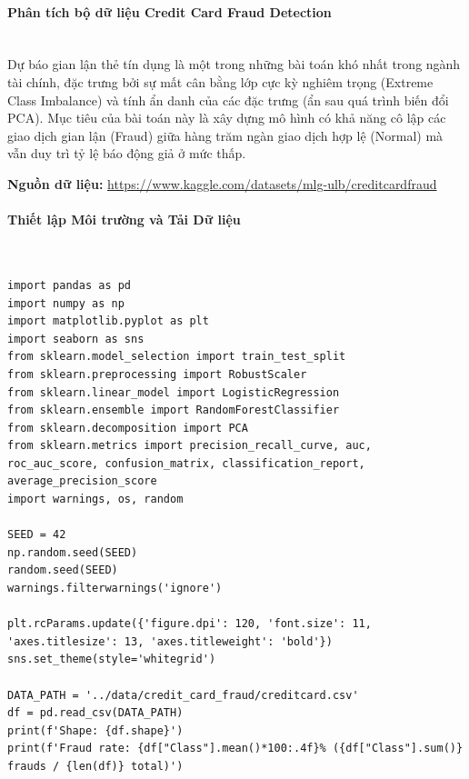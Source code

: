 \paragraph{Phân tích bộ dữ liệu Credit Card Fraud Detection} \hfill \\

Dự báo gian lận thẻ tín dụng là một trong những bài toán khó nhất trong ngành tài chính, đặc trưng bởi sự mất cân bằng lớp cực kỳ nghiêm trọng (Extreme Class Imbalance) và tính ẩn danh của các đặc trưng (ẩn sau quá trình biến đổi PCA). Mục tiêu của bài toán này là xây dựng mô hình có khả năng cô lập các giao dịch gian lận (Fraud) giữa hàng trăm ngàn giao dịch hợp lệ (Normal) mà vẫn duy trì tỷ lệ báo động giả ở mức thấp.

\begin{center}
    \textbf{Nguồn dữ liệu:} \url{https://www.kaggle.com/datasets/mlg-ulb/creditcardfraud}
\end{center}

\paragraph{Thiết lập Môi trường và Tải Dữ liệu} \hfill \\

\begin{lstlisting}[style=pythoncode, caption={Load libraries and initialize random seed for reproducibility}]
import pandas as pd
import numpy as np
import matplotlib.pyplot as plt
import seaborn as sns
from sklearn.model_selection import train_test_split
from sklearn.preprocessing import RobustScaler
from sklearn.linear_model import LogisticRegression
from sklearn.ensemble import RandomForestClassifier
from sklearn.decomposition import PCA
from sklearn.metrics import precision_recall_curve, auc, roc_auc_score, confusion_matrix, classification_report, average_precision_score
import warnings, os, random

SEED = 42
np.random.seed(SEED)
random.seed(SEED)
warnings.filterwarnings('ignore')

plt.rcParams.update({'figure.dpi': 120, 'font.size': 11, 'axes.titlesize': 13, 'axes.titleweight': 'bold'})
sns.set_theme(style='whitegrid')

DATA_PATH = '../data/credit_card_fraud/creditcard.csv'
df = pd.read_csv(DATA_PATH)
print(f'Shape: {df.shape}')
print(f'Fraud rate: {df["Class"].mean()*100:.4f}% ({df["Class"].sum()} frauds / {len(df)} total)')
\end{lstlisting}

